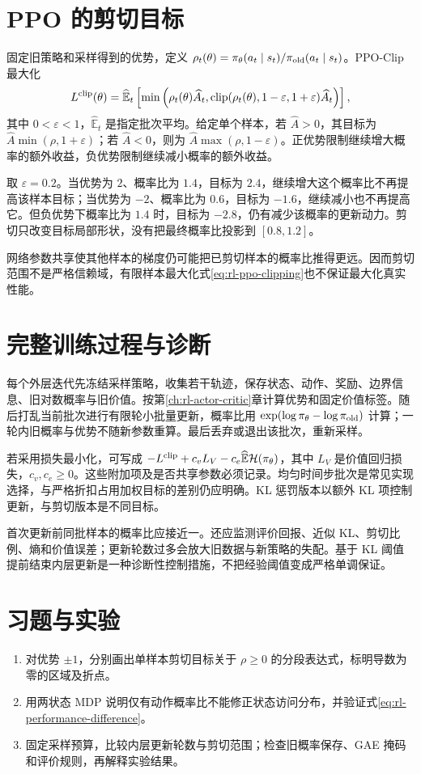 \section{PPO 的剪切目标}

固定旧策略和采样得到的优势，定义 $\rho_t(\theta)=\pi_\theta(a_t\mid s_t)/\pi_{\rm old}(a_t\mid s_t)$。PPO-Clip 最大化
\begin{equation}
L^{\rm clip}(\theta)=\widehat{\mathbb E}_t
\left[\min\left(\rho_t(\theta)\widehat A_t,
\operatorname{clip}(\rho_t(\theta),1-\varepsilon,1+\varepsilon)\widehat A_t\right)\right],
\label{eq:rl-ppo-clipping}
\end{equation}
其中 $0<\varepsilon<1$，$\widehat{\mathbb E}_t$ 是指定批次平均。给定单个样本，若 $\widehat A>0$，其目标为 $\widehat A\min(\rho,1+\varepsilon)$；若 $\widehat A<0$，则为 $\widehat A\max(\rho,1-\varepsilon)$。正优势限制继续增大概率的额外收益，负优势限制继续减小概率的额外收益。

\begin{example}[剪切并非硬约束]
取 $\varepsilon=0.2$。当优势为 $2$、概率比为 $1.4$，目标为 $2.4$，继续增大这个概率比不再提高该样本目标；当优势为 $-2$、概率比为 $0.6$，目标为 $-1.6$，继续减小也不再提高它。但负优势下概率比为 $1.4$ 时，目标为 $-2.8$，仍有减少该概率的更新动力。剪切只改变目标局部形状，没有把最终概率比投影到 $[0.8,1.2]$。
\end{example}

网络参数共享使其他样本的梯度仍可能把已剪切样本的概率比推得更远。因而剪切范围不是严格信赖域，有限样本最大化式\eqref{eq:rl-ppo-clipping}也不保证最大化真实性能。

\section{完整训练过程与诊断}

每个外层迭代先冻结采样策略，收集若干轨迹，保存状态、动作、奖励、边界信息、旧对数概率与旧价值。按第\ref{ch:rl-actor-critic}章计算优势和固定价值标签。随后打乱当前批次进行有限轮小批量更新，概率比用 $\exp(\log\pi_\theta-\log\pi_{\rm old})$ 计算；一轮内旧概率与优势不随新参数重算。最后丢弃或退出该批次，重新采样。

若采用损失最小化，可写成 $-L^{\rm clip}+c_vL_V-c_e\widehat{\mathbb E}\mathcal H(\pi_\theta)$，其中 $L_V$ 是价值回归损失，$c_v,c_e\geq0$。这些附加项及是否共享参数必须记录。均匀时间步批次是常见实现选择，与严格折扣占用加权目标的差别仍应明确。KL 惩罚版本以额外 KL 项控制更新，与剪切版本是不同目标。

首次更新前同批样本的概率比应接近一。还应监测评价回报、近似 KL、剪切比例、熵和价值误差；更新轮数过多会放大旧数据与新策略的失配。基于 KL 阈值提前结束内层更新是一种诊断性控制措施，不把经验阈值变成严格单调保证。

\section{习题与实验}
\begin{enumerate}
\item 对优势 $\pm1$，分别画出单样本剪切目标关于 $\rho\geq0$ 的分段表达式，标明导数为零的区域及折点。
\item 用两状态 MDP 说明仅有动作概率比不能修正状态访问分布，并验证式\eqref{eq:rl-performance-difference}。
\item 固定采样预算，比较内层更新轮数与剪切范围；检查旧概率保存、GAE 掩码和评价规则，再解释实验结果。
\end{enumerate}





